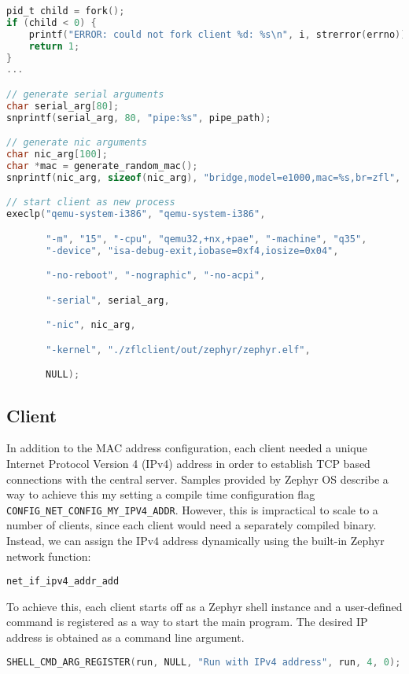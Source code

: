 \documentclass[12pt]{article}
\begin{document}
\begin{lstlisting}[language=C,caption=Client forking process]
pid_t child = fork();
if (child < 0) {
    printf("ERROR: could not fork client %d: %s\n", i, strerror(errno));
    return 1;
}
...

// generate serial arguments
char serial_arg[80];
snprintf(serial_arg, 80, "pipe:%s", pipe_path);

// generate nic arguments
char nic_arg[100];
char *mac = generate_random_mac();
snprintf(nic_arg, sizeof(nic_arg), "bridge,model=e1000,mac=%s,br=zfl", mac);

// start client as new process
execlp("qemu-system-i386", "qemu-system-i386",

       "-m", "15", "-cpu", "qemu32,+nx,+pae", "-machine", "q35",
       "-device", "isa-debug-exit,iobase=0xf4,iosize=0x04",

       "-no-reboot", "-nographic", "-no-acpi",

       "-serial", serial_arg,

       "-nic", nic_arg,

       "-kernel", "./zflclient/out/zephyr/zephyr.elf",

       NULL);
\end{lstlisting}

\subsection{Client}
In addition to the MAC address configuration, each client needed a unique Internet Protocol Version
4 (IPv4) address in order to establish TCP based connections with the central server. Samples
provided by Zephyr OS describe a way to achieve this my setting a compile time configuration flag
\verb|CONFIG_NET_CONFIG_MY_IPV4_ADDR|. However, this is impractical to scale to a number of clients, since
each client would need a separately compiled binary. Instead, we can assign the IPv4 address
dynamically using the built-in Zephyr network function:
\begin{verbatim}
net_if_ipv4_addr_add
\end{verbatim}
To achieve this, each client starts off as a Zephyr shell instance and a user-defined command is registered as a way to start the main program.
The desired IP address is obtained as a command line argument.

\begin{lstlisting}[language=C, caption=Registering user defined command "run" to the function pointer run]
SHELL_CMD_ARG_REGISTER(run, NULL, "Run with IPv4 address", run, 4, 0);
\end{lstlisting}
\end{document}
